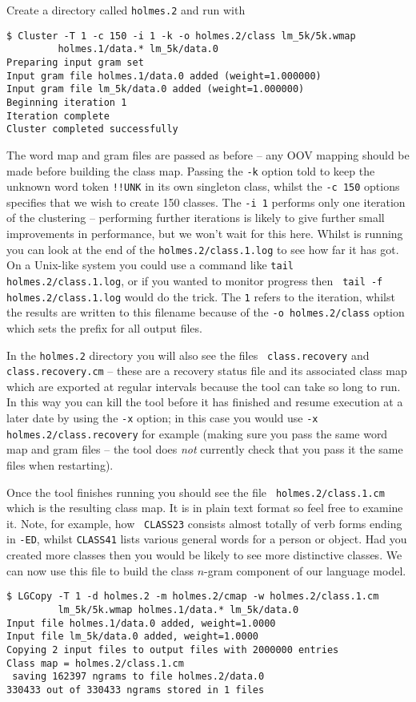 Create a directory called {\tt holmes.2} and run  with
\begin{verbatim}
$ Cluster -T 1 -c 150 -i 1 -k -o holmes.2/class lm_5k/5k.wmap
         holmes.1/data.* lm_5k/data.0
Preparing input gram set
Input gram file holmes.1/data.0 added (weight=1.000000)
Input gram file lm_5k/data.0 added (weight=1.000000)
Beginning iteration 1
Iteration complete
Cluster completed successfully
\end{verbatim} %
The word map and gram files are passed as before -- any OOV mapping
should be made before building the class map.  Passing the {\tt -k}
option told  to keep the unknown word token {\tt !!UNK}
in its own singleton class, whilst the {\tt -c 150} options specifies
that we wish to create 150 classes.  The {\tt -i 1} performs only one
iteration of the clustering -- performing further iterations is likely
to give further small improvements in performance, but we won't wait
for this here.  Whilst  is running you can look at the
end of the {\tt holmes.2/class.1.log} to see how far it has got.  On a
Unix-like system you could use a command like {\tt tail
holmes.2/class.1.log}, or if you wanted to monitor progress then {\tt
tail -f holmes.2/class.1.log} would do the trick.  The {\tt 1} refers
to the iteration, whilst the results are written to this filename
because of the {\tt -o holmes.2/class} option which sets the prefix
for all output files.

In the {\tt holmes.2} directory you will also see the files {\tt
class.recovery} and {\tt class.recovery.cm} -- these are a recovery
status file and its associated class map which are exported at regular
intervals because the  tool can take so long to run.
In this way you can kill the tool before it has finished and resume
execution at a later date by using the {\tt -x} option; in this case
you would use {\tt -x holmes.2/class.recovery} for example (making
sure you pass the same word map and gram files -- the tool does
{\it not} currently check that you pass it the same files when restarting).

Once the tool finishes running you should see the file {\tt
holmes.2/class.1.cm} which is the resulting class map.  It is in plain
text format so feel free to examine it.  Note, for example, how {\tt
CLASS23} consists almost totally of verb forms ending in {\tt -ED},
whilst {\tt CLASS41} lists various general words for a person or
object.  Had you created more classes then you would be likely to see
more distinctive classes.  We can now use this file to build the class
$n$-gram component of our language model.
\begin{verbatim}
$ LGCopy -T 1 -d holmes.2 -m holmes.2/cmap -w holmes.2/class.1.cm
         lm_5k/5k.wmap holmes.1/data.* lm_5k/data.0
Input file holmes.1/data.0 added, weight=1.0000
Input file lm_5k/data.0 added, weight=1.0000
Copying 2 input files to output files with 2000000 entries
Class map = holmes.2/class.1.cm
 saving 162397 ngrams to file holmes.2/data.0 
330433 out of 330433 ngrams stored in 1 files
\end{verbatim} %

